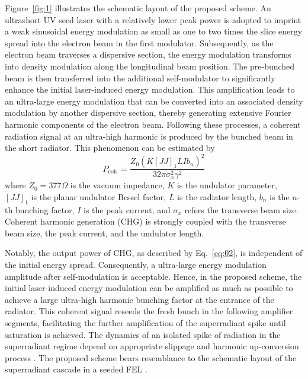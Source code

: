 \documentclass[%
 reprint,
 amsmath,amssymb,
 aps,
]{revtex4-2}
\begin{document}
Figure~\ref{fig:1} illustrates the schematic layout of the proposed scheme. An ultrashort UV seed laser with a relatively lower peak power is adopted to imprint a weak sinusoidal energy modulation as small as one to two times the slice energy spread into the electron beam in the first modulator. Subsequently, as the electron beam traverses a dispersive section, the energy modulation transforms into density modulation along the longitudinal beam position. The pre-bunched beam is then transferred into the additional self-modulator to significantly enhance the initial laser-induced energy modulation. This amplification leads to an ultra-large energy modulation that can be converted into an associated density modulation by another dispersive section, thereby generating extensive Fourier harmonic components of the electron beam. Following these processes, a coherent radiation signal at an ultra-high harmonic is produced by the bunched beam in the short radiator. This phenomenon can be estimated by \citep{Yu2002}
\begin{equation}
    P_{\mathrm{coh\ }}=\frac{Z_0\left(K\left[JJ\right]_1LIb_n\right)^2}{32\pi\sigma_x^2\gamma^2}\label{eq:02}
\end{equation}
where $Z_{0} = 377 \Omega$ is the vacuum impedance, $K$ is the undulator parameter, $[JJ]_{1}$ is the planar undulator Bessel factor, $L$ is the radiator length, $b_{n}$ is the $n$-th bunching factor, $I$ is the peak current, and $\sigma_{x}$ refers the transverse beam size. Coherent harmonic generation (CHG) is strongly coupled with the transverse beam size, the peak current, and the undulator length.

Notably, the output power of CHG, as described by Eq.~\ref{eq:02}, is independent of the initial energy spread. Consequently, a ultra-large energy modulation amplitude after self-modulation is acceptable. Hence, in the proposed scheme, the initial laser-induced energy modulation can be amplified as much as possible to achieve a large ultra-high harmonic bunching factor at the entrance of the radiator. This coherent signal reseeds the fresh bunch in the following amplifier segments, facilitating the further amplification of the superradiant spike until saturation is achieved. The dynamics of an isolated spike of radiation in the superradiant regime depend on appropriate slippage and harmonic up-conversion process \citep{Giannessi2005, Finetti2017, Yang2020}. The proposed scheme bears resemblance to the schematic layout of the superradiant cascade in a seeded FEL \citep{Mirian2021}.
\end{document}
